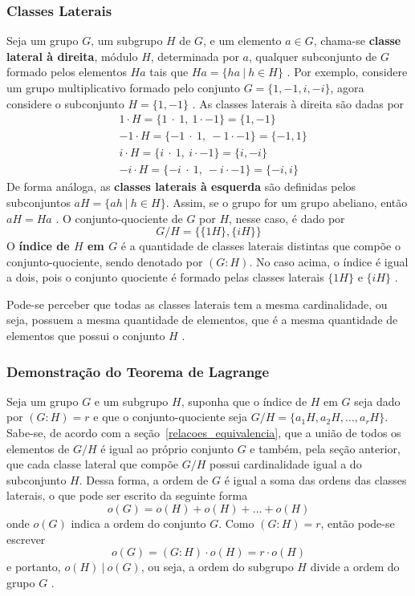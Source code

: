 \subsubsection{Classes Laterais}
Seja um grupo \(G\), um subgrupo \(H\) de \(G\), e um elemento \(a \in G\), chama-se \textbf{classe lateral à direita}, módulo \(H\), determinada por \(a\), qualquer subconjunto de \(G\) formado pelos elementos \(Ha\) tais que \(Ha = \{ha\ |\  h \in H\}\) \cite{Gilbert:2004}. Por exemplo, considere um grupo multiplicativo formado pelo conjunto \(G = \{1, -1, i, -i\}\), agora considere o subconjunto \(H = \{1, -1\}\) \cite{Domingues:2003}. As classes laterais à direita são dadas por
\begin{align*}
  &1\cdot H = \{1\ \cdot\ 1,\ 1 \cdot -1\} = \{1, -1\} \\
  &-1\cdot H = \{-1\ \cdot\ 1,\ -1 \cdot -1\} = \{-1, 1\} \\
  &i\cdot H = \{i\ \cdot\ 1,\ i \cdot -1\} = \{i, -i\} \\
  &-i\cdot H = \{-i\ \cdot\ 1,\ -i \cdot -1\} = \{-i, i\}
\end{align*}
De forma análoga, as \textbf{classes laterais à esquerda} são definidas pelos subconjuntos \(aH = \{ah\ |\ h \in H\}\). Assim, se o grupo for um grupo abeliano, então \(aH = Ha\) \cite{Domingues:2003}.
O conjunto-quociente de \(G\) por \(H\), nesse caso, é dado por
$$
  G / H = \{\{1H\}, \{iH\}\}
$$
O \textbf{índice de \(H\) em \(G\)} é a quantidade de classes laterais distintas que compõe o conjunto-quociente, sendo denotado por \((G : H)\). No caso acima, o índice é igual a dois, pois o conjunto quociente é formado pelas classes laterais \(\{1H\}\) e \(\{iH\}\) \cite{Domingues:2003}.

Pode-se perceber que todas as classes laterais tem a mesma cardinalidade, ou seja, possuem a mesma quantidade de elementos, que é a mesma quantidade de elementos que possui o conjunto \(H\) \cite{Shoup:2005}.

%
%
\subsubsection{Demonstração do Teorema de Lagrange}
Seja um grupo \(G\) e um subgrupo \(H\), suponha que o índice de \(H\) em \(G\) seja dado por \((G : H) = r\) e que o conjunto-quociente seja \(G / H = \{a_1H, a_2H, \ldots, a_rH\}\). Sabe-se, de acordo com a seção~\ref{relacoes_equivalencia}, que a união de todos os elementos de \(G/H\) é igual ao próprio conjunto \(G\) e também, pela seção anterior, que cada classe lateral que compõe \(G/H\) possui cardinalidade igual a do subconjunto \(H\). Dessa forma, a ordem de \(G\) é igual a soma das ordens das classes laterais, o que pode ser escrito da seguinte forma
$$
  o(G) = o(H) + o(H) + \ldots + o(H)
$$
onde \(o(G)\) indica a ordem do conjunto \(G\). Como \((G : H) = r\), então pode-se escrever
$$
  o(G) = (G : H)\cdot o(H) = r\cdot o(H)
$$
e portanto, \(o(H)\ |\ o(G)\), ou seja, a ordem do subgrupo \(H\) divide a ordem do grupo \(G\) \cite{Domingues:2003}.
%
%
